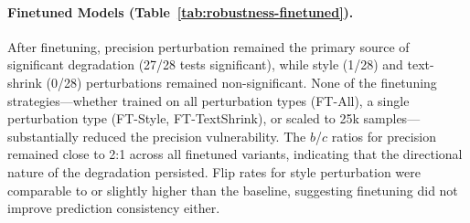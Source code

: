 \paragraph{Finetuned Models (Table~\ref{tab:robustness-finetuned}).}
After finetuning, precision perturbation remained the primary source of significant degradation (27/28 tests significant), while style (1/28) and text-shrink (0/28) perturbations remained non-significant. None of the finetuning strategies---whether trained on all perturbation types (FT-All), a single perturbation type (FT-Style, FT-TextShrink), or scaled to 25k samples---substantially reduced the precision vulnerability. The $b$/$c$ ratios for precision remained close to 2:1 across all finetuned variants, indicating that the directional nature of the degradation persisted. Flip rates for style perturbation were comparable to or slightly higher than the baseline, suggesting finetuning did not improve prediction consistency either.
